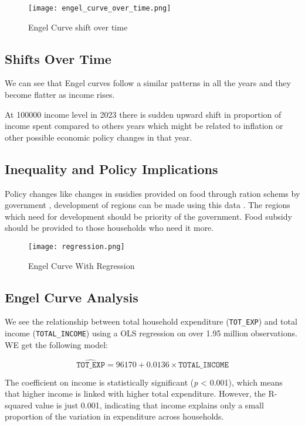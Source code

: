 \documentclass[12pt]{article}
\begin{document}
\begin{figure}[h!]
    \centering
    \texttt{[image: engel\_curve\_over\_time.png]}
    \caption{Engel Curve shift over time}
    \label{fig:engel}
\end{figure}

\subsection*{Shifts Over Time}
We can see that Engel curves follow a similar patterns in all the years and they become flatter as income rises.


At 100000 income level in 2023 there is sudden upward shift in proportion of income spent compared to others years which might be related to inflation or other possible economic policy changes in that year. 


\subsection*{Inequality and Policy Implications}
Policy changes like changes in susidies provided on food through ration schems by government , development of regions can be made using this data . The regions which need for development should be priority of the government. Food subsidy should be provided to those households who need it more.

\begin{figure}[h!]
    \centering
    \texttt{[image: regression.png]}
    \caption{Engel Curve With Regression}
    \label{fig:engel}
\end{figure}

\subsection*{Engel Curve Analysis}

We see the relationship between total household expenditure (\texttt{TOT\_EXP}) and total income (\texttt{TOTAL\_INCOME}) using a OLS regression on over 1.95 million observations. WE get the following model:

\[
\widehat{\texttt{TOT\_EXP}} = 96170 + 0.0136 \times \texttt{TOTAL\_INCOME}
\]

The coefficient on income is statistically significant (\emph{p} < 0.001), which means that higher income is linked with higher total expenditure. However, the R-squared value is just 0.001, indicating that income explains only a small proportion of the variation in expenditure across households.
\end{document}
